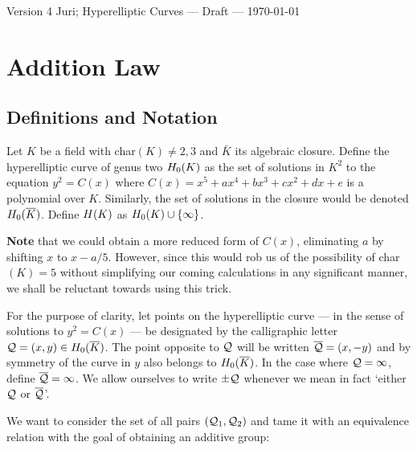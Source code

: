 \documentclass[english,11pt,a4paper]{article}
\begin{document}

Version 4 \scriptsize \hfill Juri; Hyperelliptic Curves --- Draft --- \today
\normalsize

\section{Addition Law}

\subsection{Definitions and Notation}

\begin{defin}
	Let $K$ be a field with char$(K) \neq 2, 3$ and $\bar K$ its algebraic closure. Define the hyperelliptic curve of genus two $H_0(K)$ as the set of solutions in $K^2$ to the equation $y^2=C(x)$ where $C(x)=x^5+ax^4+bx^3+cx^2+dx+e$ is a polynomial over $K$. Similarly, the set of solutions in the closure would be denoted $H_0(\overline K)$.	Define $H(K)$ as $H_0(K) \cup \{ \infty \}$.

	\textbf{Note} that we could obtain a more reduced form of $C(x)$, eliminating $a$ by shifting $x$ to $x-a/5$. However, since this would rob us of the possibility of char$(K) = 5$ without simplifying our coming calculations in any significant manner, we shall be reluctant towards using this trick.

	For the purpose of clarity, let points on the hyperelliptic curve --- in the sense of solutions to $y^2=C(x)$ --- be designated by the calligraphic letter $\mathcal{Q}=(x,y) \in H_0(\overline K)$. The point opposite to $\mathcal{Q}$ will be written $\overline {\mathcal{Q}} = (x,-y)$ and by symmetry of the curve in $y$ also belongs to $H_0(\overline K)$. In the case where $\mathcal{Q} = \infty$, define $\overline {\mathcal{Q}} = \infty$. We allow ourselves to write $\pm \mathcal{Q}$ whenever we mean in fact `either $\mathcal{Q}$ or $\overline {\mathcal{Q}}$'.

	We want to consider the set of all pairs $(\mathcal{Q}_1,\mathcal{Q}_2)$ and tame it with an equivalence relation with the goal of obtaining an additive group:
\end{defin}
\end{document}
